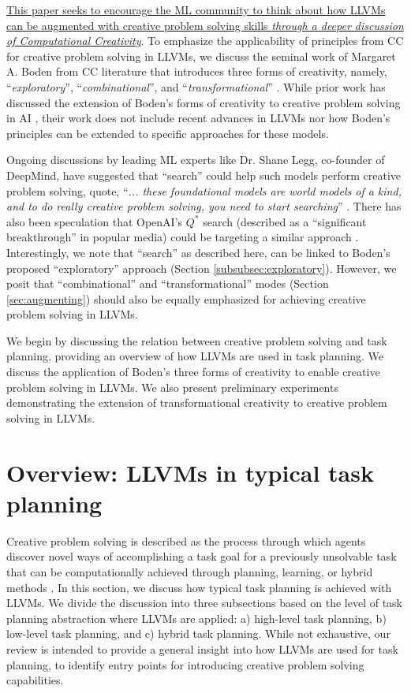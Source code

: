 \ul{This paper seeks to encourage the ML community to think about how LLVMs can be augmented with creative problem solving skills \textit{through a deeper discussion of Computational Creativity}}. To emphasize the applicability of principles from CC for creative problem solving in LLVMs, we discuss the seminal work of Margaret A. Boden from CC literature that introduces three forms of creativity, namely, ``\textit{exploratory}'', ``\textit{combinational}'', and ``\textit{transformational}'' \cite{boden1998creativity}. While prior work has discussed the extension of Boden's forms of creativity to creative problem solving in AI \cite{gizzi2022creative}, their work does not include recent advances in LLVMs nor how Boden's principles can be extended to specific approaches for these models.



Ongoing discussions by leading ML experts like Dr. Shane Legg, co-founder of DeepMind, have suggested that ``search'' could help such models perform creative problem solving, quote, ``\textit{... these foundational models are world models of a kind, and to do really creative problem solving, you need to start searching}'' \cite{patel2023llmsneedsearch}. There has also been speculation that OpenAI's $Q^*$ search (described as a ``significant breakthrough'' in popular media) could be targeting a similar approach \cite{wang2023nextbig,tong2023reuters}. Interestingly, we note that ``search'' as described here, can be linked to Boden's proposed ``exploratory'' approach (Section \ref{subsubsec:exploratory}). However, we posit that ``combinational'' and ``transformational'' modes (Section \ref{sec:augmenting}) should also be equally emphasized for achieving creative problem solving in LLVMs.

We begin by discussing the relation between creative problem solving and task planning, providing an overview of how LLVMs are used in task planning. We discuss the application of Boden's three forms of creativity to enable creative problem solving in LLVMs. We also present preliminary experiments demonstrating the extension of transformational creativity to creative problem solving in LLVMs.

\section{Overview: LLVMs in typical task planning}
Creative problem solving is described as the process through which agents discover novel ways of accomplishing a task goal for a previously unsolvable task that can be computationally achieved through planning, learning, or hybrid methods \cite{gizzi2022creative}. In this section, we discuss how typical task planning is achieved with LLVMs. We divide the discussion into three subsections based on the level of task planning abstraction where LLVMs are applied: a) high-level task planning, b) low-level task planning, and c) hybrid task planning. While not exhaustive, our review is intended to provide a general insight into how LLVMs are used for task planning, to identify entry points for introducing creative problem solving capabilities.

